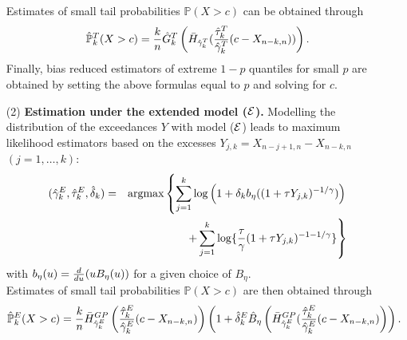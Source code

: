 \begin{enumerate}
\vspace{0.2cm}\noindent
Estimates of small tail probabilities $\mathbb{P}(X>c)$ can be obtained through 
\[
\hat{\mathbb{P}}_k^T(X>c) = {k \over n} \hat{G}^T_k 
\left( \bar{H}_{\hat{\gamma}^T_k} ({\hat{\tau}^T_k \over \hat{\gamma}^T_k}(c-X_{n-k,n}) )\right).
\]
Finally, bias reduced estimators of extreme $1-p$ quantiles for small $p$ are obtained by setting the above formulas equal to $p$ and solving for $c$. 

\item[(2)] {\bf Estimation under the extended model (${\cal E}$).} Modelling the distribution of the exceedances $Y$ with model ($\cal{E}$) leads to maximum likelihood estimators based on the excesses $Y_{j,k}=X_{n-j+1,n}-X_{n-k,n}$ $(j=1,\ldots,k)$: 
\begin{eqnarray}
(\hat{\gamma}^E_k,\hat{\tau}^E_k, \hat{\delta}_k)&=&
\mbox{argmax} \left\{
\sum_{j=1}^k \log\left( 
1+\delta_k b_{\eta}((1+\tau Y_{j,k})^{-1/\gamma}) \right)
 \right. \nonumber \\
&& \hspace{1.5cm} \left. + \sum_{j=1}^k
\log \{{\tau \over \gamma}(1+\tau Y_{j,k})^{-1-1/\gamma} \}
 \right\}
 \label{MLE}
\end{eqnarray}
with $b_{\eta}(u) ={d \over du} (uB_{\eta}(u))$ for a given choice of $B_\eta$.\\
\noindent
Estimates of small tail probabilities $\mathbb{P}(X>c)$ are then obtained through 
\[
\hat{\mathbb{P}}_k^E(X>c) = {k \over n} \bar{H}^{GP}_{\hat{\gamma}^E_k}\left({\hat{\tau}^E_k \over \hat{\gamma}^E_k}(c-X_{n-k,n}) \right) 
\left( 1+ \hat{\delta}_k^E \hat{B}_{\eta}\left(\bar{H}^{GP}_{\hat{\gamma}^E_k} ({\hat{\tau}^E_k \over \hat{\gamma}^E_k}(c-X_{n-k,n})\right)\right).
\]
 

\end{enumerate}
